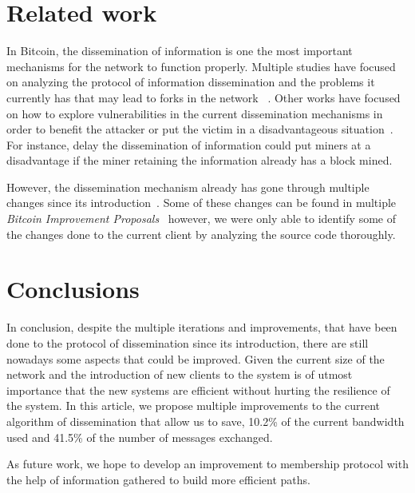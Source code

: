 \documentclass{dads}   %
\begin{document}
\section{Related work}
In Bitcoin, the dissemination of information is one the most important mechanisms for the network to function properly. Multiple studies have focused on analyzing the protocol of information dissemination and the problems it currently has that may lead to forks in the network ~\cite{decker2013information,croman2016scaling,miller2015discovering}.
Other works have focused on how to explore vulnerabilities in the current dissemination mechanisms in order to benefit the attacker or put the victim in a disadvantageous situation~\cite{apostolaki2016hijacking, sapirshtein2016optimal, eyal2014majority}. For instance, delay the dissemination of information could put miners at a disadvantage if the miner retaining the information already has a block mined.

However, the dissemination mechanism already has gone through multiple changes since its introduction~\cite{nakamoto2008bitcoin}. Some of these changes can be found in multiple \textsl{Bitcoin Improvement Proposals}~\cite{bip152,bips} however, we were only able to identify some of the changes done to the current client by analyzing the source code thoroughly. 

\section{Conclusions}
In conclusion, despite the multiple iterations and improvements, that have been done to the protocol of dissemination since its introduction, there are still nowadays some aspects that could be improved. Given the current size of the network and the introduction of new clients to the system is of utmost importance that the new systems are efficient without hurting the resilience of the system. In this article, we propose multiple improvements to the current algorithm of dissemination that allow us to save, 10.2\% of the current bandwidth used and 41.5\% of the number of messages exchanged.

As future work, we hope to develop an improvement to membership protocol with the help of information gathered to build more efficient paths.

%

%
%
\end{document}
